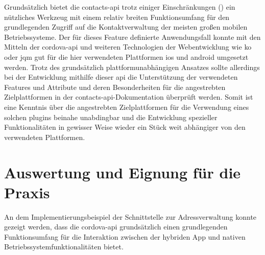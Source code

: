 Grundsätzlich bietet die \gls{contacts-api} trotz einiger Einschränkungen (\so) ein nützliches Werkzeug mit einem relativ breiten Funktionsumfang für den grundlegenden Zugriff auf die Kontaktverwaltung der meisten großen mobilen Betriebssysteme.
Der für dieses Feature definierte Anwendungsfall konnte mit den Mitteln der \gls{cordova}-\gls{api} und weiteren Technologien der Webentwicklung wie \gls{ko} oder \gls{jqm} gut für die hier verwendeten Plattformen \gls{ios} und \gls{android} umgesetzt werden.
Trotz des grundsätzlich plattformunabhängigen Ansatzes sollte allerdings bei der Entwicklung mithilfe dieser \gls{api} die Unterstützung der verwendeten Features und Attribute und deren Besonderheiten für die angestrebten Zielplattformen in der \gls{contacts-api}-Dokumentation überprüft werden.
Somit ist eine Kenntnis über die angestrebten Zielplattformen für die Verwendung eines solchen \glspl{plugin} beinahe unabdingbar und die Entwicklung spezieller Funktionalitäten in gewisser Weise wieder ein Stück weit abhängiger von den verwendeten Plattformen. %



\chapter{Auswertung und Eignung für die Praxis} %

An dem Implementierungsbeispiel der Schnittstelle zur Adressverwaltung konnte gezeigt werden, dass die \gls{cordova}-\gls{api} grundsätzlich einen grundlegenden Funktionsumfang für die Interaktion zwischen der hybriden App und nativen Betriebssystemfunktionalitäten bietet.

